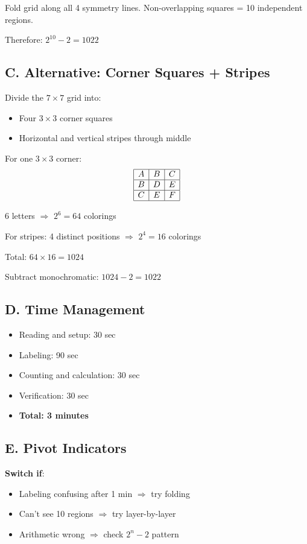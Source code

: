 \documentclass[]{article}
\begin{document}
\begin{solutionbox}
Fold grid along all 4 symmetry lines. Non-overlapping squares = 10 independent regions.

Therefore: $2^{10} - 2 = 1022$

\subsection*{C. Alternative: Corner Squares + Stripes}

Divide the $7 \times 7$ grid into:
\begin{itemize}[nosep]
    \item Four $3 \times 3$ corner squares
    \item Horizontal and vertical stripes through middle
\end{itemize}

For one $3 \times 3$ corner:
$$\begin{array}{|c|c|c|}
\hline
A & B & C \\
\hline
B & D & E \\
\hline
C & E & F \\
\hline
\end{array}$$

6 letters $\Rightarrow$ $2^6 = 64$ colorings

For stripes: 4 distinct positions $\Rightarrow$ $2^4 = 16$ colorings

Total: $64 \times 16 = 1024$

Subtract monochromatic: $1024 - 2 = 1022$

\subsection*{D. Time Management}

\begin{itemize}[leftmargin=*]
    \item Reading and setup: 30 sec
    \item Labeling: 90 sec
    \item Counting and calculation: 30 sec
    \item Verification: 30 sec
    \item \textbf{Total: 3 minutes}
\end{itemize}

\subsection*{E. Pivot Indicators}

\textbf{Switch if}:
\begin{itemize}[nosep]
    \item Labeling confusing after 1 min $\Rightarrow$ try folding
    \item Can't see 10 regions $\Rightarrow$ try layer-by-layer
    \item Arithmetic wrong $\Rightarrow$ check $2^n - 2$ pattern
\end{itemize}


\end{solutionbox}
\end{document}
